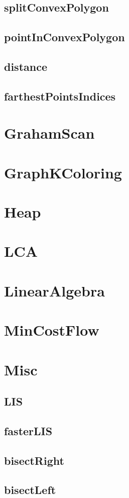 \documentclass[a4paper]{article}
\begin{document}
\subsection{splitConvexPolygon}
\subsection{pointInConvexPolygon}
\subsection{distance}
\subsection{farthestPointsIndices}
\section{GrahamScan}
\section{GraphKColoring}
\section{Heap}
\section{LCA}
\section{LinearAlgebra}
\section{MinCostFlow}
\section{Misc}
\subsection{LIS}
\subsection{fasterLIS}
\subsection{bisectRight}
\subsection{bisectLeft}
\end{document}
